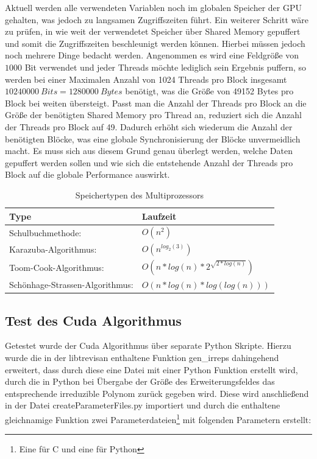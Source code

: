  Aktuell werden alle verwendeten Variablen noch im globalen Speicher der GPU gehalten, was jedoch zu langsamen Zugriffszeiten führt. Ein weiterer Schritt wäre zu prüfen, in wie weit der verwendetet Speicher über Shared Memory gepuffert und somit die Zugriffszeiten beschleunigt werden können. Hierbei müssen jedoch noch mehrere Dinge bedacht werden. Angenommen es wird eine Feldgröße von $1000$ Bit verwendet und jeder Threads möchte lediglich sein Ergebnis puffern, so werden bei einer Maximalen Anzahl von 1024 Threads pro Block insgesamt $10240000\ Bits = 1280000\ Bytes$ benötigt, was die Größe von 49152 Bytes pro Block bei weiten übersteigt. Passt man die Anzahl der Threads pro Block an die Größe der benötigten Shared Memory pro Thread an, reduziert sich die Anzahl der Threads pro Block auf 49. Dadurch erhöht sich wiederum die Anzahl der benötigten Blöcke, was eine globale Synchronisierung der Blöcke unvermeidlich macht. Es muss sich aus diesem Grund genau überlegt werden, welche Daten gepuffert werden sollen und wie sich die entstehende Anzahl der Threads pro Block auf die globale Performance auswirkt.

\begin{table}
\centering
\begin{tabular}{ll}
\hline \hline
Type & Laufzeit \\
\hline
Schulbuchmethode: & $O(n^2)$ \\
Karazuba-Algorithmus: & $O(n^{log_2(3)})$ \\
Toom-Cook-Algorithmus: & $O(n*log(n)*2^{\sqrt{2*log(n)}})$ \\
Schönhage-Strassen-Algorithmus: & $O(n*log(n)*log(log(n)))$ \\
\end{tabular}
\caption{Speichertypen des Multiprozessors}
\label{table:memory}
\end{table}

\subsection{Test des Cuda Algorithmus}
Getestet wurde der Cuda Algorithmus über separate Python Skripte. Hierzu wurde die in der libtrevisan enthaltene Funktion gen\_irreps dahingehend erweitert, dass durch diese eine Datei mit einer Python Funktion erstellt wird, durch die in Python bei Übergabe der Größe des Erweiterungsfeldes das entsprechende irreduzible Polynom zurück gegeben wird. Diese wird anschließend in der Datei createParameterFiles.py importiert und durch die enthaltene gleichnamige Funktion zwei Parameterdateien\footnote{Eine für C und eine für Python} mit folgenden Parametern erstellt:

